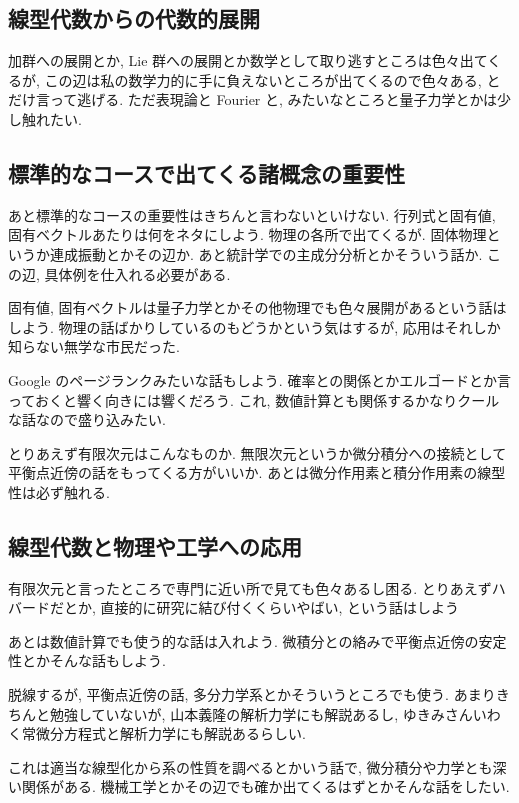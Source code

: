 \documentclass[openany, a4paper, oneside]{book}
\theoremstyle{break}
\theoremstyle{breakdefn}
\begin{document}
\subsection{線型代数からの代数的展開}
\label{sec-7-4-1-2}

加群への展開とか, Lie 群への展開とか数学として取り逃すところは色々出てくるが,
この辺は私の数学力的に手に負えないところが出てくるので色々ある, とだけ言って逃げる.
ただ表現論と Fourier と, みたいなところと量子力学とかは少し触れたい.
\subsection{標準的なコースで出てくる諸概念の重要性}
\label{sec-7-4-1-3}

あと標準的なコースの重要性はきちんと言わないといけない.
行列式と固有値, 固有ベクトルあたりは何をネタにしよう.
物理の各所で出てくるが. 固体物理というか連成振動とかその辺か.
あと統計学での主成分分析とかそういう話か.
この辺, 具体例を仕入れる必要がある.

固有値, 固有ベクトルは量子力学とかその他物理でも色々展開があるという話はしよう.
物理の話ばかりしているのもどうかという気はするが, 応用はそれしか知らない無学な市民だった.

Google のページランクみたいな話もしよう.
確率との関係とかエルゴードとか言っておくと響く向きには響くだろう.
これ, 数値計算とも関係するかなりクールな話なので盛り込みたい.

とりあえず有限次元はこんなものか.
無限次元というか微分積分への接続として平衡点近傍の話をもってくる方がいいか.
あとは微分作用素と積分作用素の線型性は必ず触れる.
\subsection{線型代数と物理や工学への応用}
\label{sec-7-4-1-4}

有限次元と言ったところで専門に近い所で見ても色々あるし困る.
とりあえずハバードだとか, 直接的に研究に結び付くくらいやばい, という話はしよう

あとは数値計算でも使う的な話は入れよう.
微積分との絡みで平衡点近傍の安定性とかそんな話もしよう.

脱線するが, 平衡点近傍の話, 多分力学系とかそういうところでも使う.
あまりきちんと勉強していないが, 山本義隆の解析力学にも解説あるし,
ゆきみさんいわく常微分方程式と解析力学にも解説あるらしい.

これは適当な線型化から系の性質を調べるとかいう話で, 微分積分や力学とも深い関係がある.
機械工学とかその辺でも確か出てくるはずとかそんな話をしたい.
\end{document}
